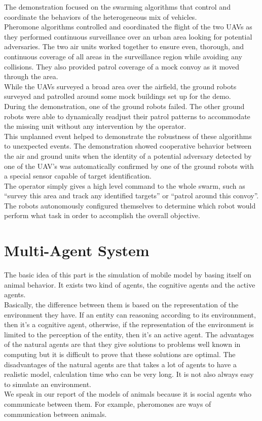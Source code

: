 The demonstration focused on the swarming algorithms that control and coordinate the behaviors of the heterogeneous mix of vehicles.\\
Pheromone  algorithms  controlled  and  coordinated  the  flight  of  the  two  UAVs  as  they performed continuous  surveillance  over  an  urban  area  looking  for  potential  adversaries. The  two  air  units worked together to ensure even, thorough, and continuous coverage of all areas in the surveillance region  while  avoiding  any  collisions. They  also  provided  patrol coverage  of  a  mock  convoy  as  it moved through the area.\\ 
While the UAVs surveyed a broad area over the airfield, the ground robots surveyed and patrolled around  some  mock  buildings  set  up  for  the  demo.\\
During  the  demonstration,  one  of  the  ground robots  failed. The other  ground  robots were  able  to  dynamically  readjust  their  patrol  patterns to accommodate  the  missing  unit without  any  intervention  by  the  operator.\\
This unplanned  event helped to demonstrate the robustness of these algorithms to unexpected events. The  demonstration  showed  cooperative  behavior  between  the  air  and  ground  units when  the identity of a potential adversary detected by one of the UAV’s was automatically confirmed by one of the ground robots with a special sensor capable of target identification.\\
The operator simply gives a high level command to the whole swarm, such as “survey this area and track  any  identified  targets”  or  “patrol  around  this  convoy”.\\
The  robots  autonomously  configured themselves to determine which robot would perform what task in order to accomplish the overall objective.

\newpage

\section{Multi-Agent System}

The basic idea of this part is the simulation of mobile model by basing itself on animal behavior. It exists two kind of agents, the cognitive agents and the active agents.\\
Basically, the difference  between them is based on the representation of the environment they have. If an entity can reasoning according to its environnment, then it's a cognitive agent, otherwise, if the representation of the environment is limited to the perception of the entity, then it's an active agent. The advantages of the natural agents are that they give solutions to problems well known in computing but it is difficult to prove that these solutions are optimal. The disadvantages of the natural agents are that takes a lot of agents to have a realistic model, calculation time who can be very long.  It is not also always easy to simulate an environment.\\
We speak in our report of the models of animals because it is social agents who communicate between them. For example, pheromones are ways of communication between animals.

